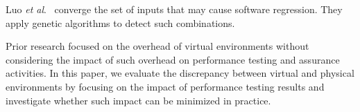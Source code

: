 
Luo \textit{et al$.$}~\cite{Luo:2016:MPR:2901739.2901765} converge the set of inputs that may cause software regression. They apply genetic algorithms to detect such combinations. 

Prior research focused on the overhead of virtual environments without considering the impact of such overhead on performance testing and assurance activities. In this paper, we evaluate the discrepancy between virtual and physical environments by focusing on the impact of performance testing results and investigate whether such impact can be minimized in practice.

